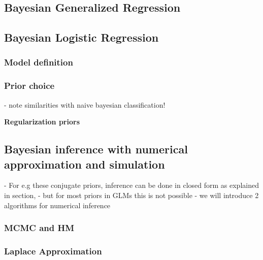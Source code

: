 \subsection{Bayesian Generalized Regression}\label{sec:logit-glm}



\subsection{Bayesian Logistic Regression} \label{sec:logit-logit}

\subsubsection*{Model definition}

\subsubsection*{Prior choice}


- note similarities with naive bayesian classification!

\textbf{Regularization priors}


\subsection{Bayesian inference with numerical approximation and simulation} \label{sec:logit-inf}

- For e.g these conjugate priors, inference can be done in closed form as explained in section, 
- but for most priors in GLMs this is not possible
- we will introduce 2 algorithms for numerical inference

\subsubsection*{MCMC and HM}


\subsubsection*{Laplace Approximation}
